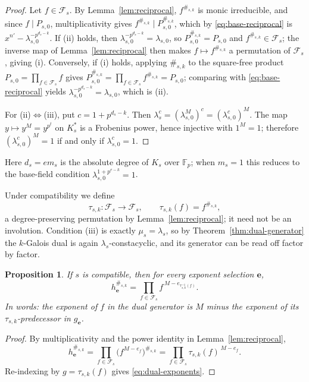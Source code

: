 \documentclass[preprint,12pt,a4paper]{elsarticle}
\newcommand{\F}{\mathbb F}
\newcommand{\Fs}{\mathcal F_s}
\newtheorem{proposition}[theorem]{Proposition}
\theoremstyle{definition}
\theoremstyle{remark}
\begin{document}
\begin{proof}
Let $f\in\Fs$.  By Lemma~\ref{lem:reciprocal}, $f^{\#_{s,k}}$ is monic
irreducible, and since $f\mid P_{s,0}$, multiplicativity gives
$f^{\#_{s,k}}\mid P_{s,0}^{\#_{s,k}}$, which by \eqref{eq:base-reciprocal} is
$x^{n'}-\lambda_{s,0}^{-p^{d_s-k}}$.  If (ii) holds, then
$\lambda_{s,0}^{-p^{d_s-k}}=\lambda_{s,0}$, so
$P_{s,0}^{\#_{s,k}}=P_{s,0}$ and $f^{\#_{s,k}}\in\Fs$; the inverse map of
Lemma~\ref{lem:reciprocal} then makes $f\mapsto f^{\#_{s,k}}$ a permutation of
$\Fs$, giving (i).  Conversely, if (i) holds, applying $\#_{s,k}$ to the
square-free product $P_{s,0}=\prod_{f\in\Fs}f$ gives
$P_{s,0}^{\#_{s,k}}=\prod_{f\in\Fs}f^{\#_{s,k}}=P_{s,0}$; comparing with
\eqref{eq:base-reciprocal} yields
$\lambda_{s,0}^{-p^{d_s-k}}=\lambda_{s,0}$, which is (ii).

For (ii)$\Leftrightarrow$(iii), put $c=1+p^{d_s-k}$.  Then
$\lambda_s^c=(\lambda_{s,0}^M)^c=(\lambda_{s,0}^c)^M$.  The map
$y\mapsto y^M=y^{p^t}$ on $K_s^\ast$ is a Frobenius power, hence injective with
$1^M=1$; therefore $(\lambda_{s,0}^c)^M=1$ if and only if
$\lambda_{s,0}^c=1$.
\end{proof}

Here $d_s=em_s$ is the absolute degree of $K_s$ over $\F_p$; when $m_s=1$ this
reduces to the base-field condition $\lambda_{s,0}^{1+p^{e-k}}=1$.

Under compatibility we define
\[
\tau_{s,k}:\Fs\longrightarrow\Fs,\qquad \tau_{s,k}(f)=f^{\#_{s,k}},
\]
a degree-preserving permutation by Lemma~\ref{lem:reciprocal}; it need not be
an involution.  Condition (iii) is exactly $\mu_s=\lambda_s$, so by
Theorem~\ref{thm:dual-generator} the $k$-Galois dual is again
$\lambda_s$-constacyclic, and its generator can be read off factor by factor.

\begin{proposition}\label{prop:dual-exponents}
If $s$ is compatible, then for every exponent selection $\mathbf{e}$,
\begin{equation}\label{eq:dual-exponents}
h_{\mathbf{e}}^{\#_{s,k}}
   =\prod_{f\in\Fs} f^{\,M-e_{\tau_{s,k}^{-1}(f)}}.
\end{equation}
In words: the exponent of $f$ in the dual generator is $M$ minus the exponent
of its $\tau_{s,k}$-predecessor in $g_{\mathbf{e}}$.
\end{proposition}

\begin{proof}
By multiplicativity and the power identity in Lemma~\ref{lem:reciprocal},
\[
h_{\mathbf{e}}^{\#_{s,k}}
 =\prod_{f\in\Fs}\bigl(f^{M-e_f}\bigr)^{\#_{s,k}}
 =\prod_{f\in\Fs}\tau_{s,k}(f)^{\,M-e_f}.
\]
Re-indexing by $g=\tau_{s,k}(f)$ gives \eqref{eq:dual-exponents}.
\end{proof}
\end{document}

